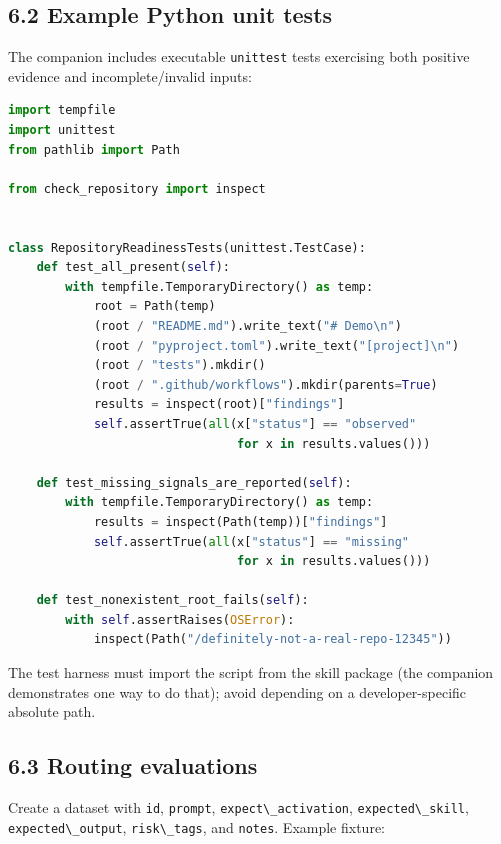 \documentclass[
  10pt,
  letterpaper,
]{article}
\newcommand{\passthrough}[1]{#1}
\begin{document}
\subsection{6.2 Example Python unit
tests}\label{example-python-unit-tests}

The companion includes executable \passthrough{\lstinline!unittest!}
tests exercising both positive evidence and incomplete/invalid inputs:

\begin{lstlisting}[language=Python]
import tempfile
import unittest
from pathlib import Path

from check_repository import inspect


class RepositoryReadinessTests(unittest.TestCase):
    def test_all_present(self):
        with tempfile.TemporaryDirectory() as temp:
            root = Path(temp)
            (root / "README.md").write_text("# Demo\n")
            (root / "pyproject.toml").write_text("[project]\n")
            (root / "tests").mkdir()
            (root / ".github/workflows").mkdir(parents=True)
            results = inspect(root)["findings"]
            self.assertTrue(all(x["status"] == "observed"
                                for x in results.values()))

    def test_missing_signals_are_reported(self):
        with tempfile.TemporaryDirectory() as temp:
            results = inspect(Path(temp))["findings"]
            self.assertTrue(all(x["status"] == "missing"
                                for x in results.values()))

    def test_nonexistent_root_fails(self):
        with self.assertRaises(OSError):
            inspect(Path("/definitely-not-a-real-repo-12345"))
\end{lstlisting}

The test harness must import the script from the skill package (the
companion demonstrates one way to do that); avoid depending on a
developer-specific absolute path.

\subsection{6.3 Routing evaluations}\label{routing-evaluations}

Create a dataset with \passthrough{\lstinline!id!},
\passthrough{\lstinline!prompt!},
\passthrough{\lstinline!expect\_activation!},
\passthrough{\lstinline!expected\_skill!},
\passthrough{\lstinline!expected\_output!},
\passthrough{\lstinline!risk\_tags!}, and
\passthrough{\lstinline!notes!}. Example fixture:
\end{document}
